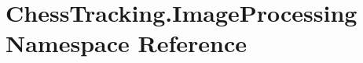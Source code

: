 \hypertarget{namespace_chess_tracking_1_1_image_processing}{}\section{Chess\+Tracking.\+Image\+Processing Namespace Reference}
\label{namespace_chess_tracking_1_1_image_processing}
